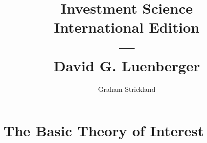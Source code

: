 \documentclass{article}
\title{Investment Science\\International Edition\\---\\David G. Luenberger}
\author{Graham Strickland}
\numberwithin{figure}{section}
\numberwithin{table}{section}
\numberwithin{equation}{section}
\begin{document}
\maketitle

\setcounter{section}{1}
\section{The Basic Theory of Interest}

\end{document}
